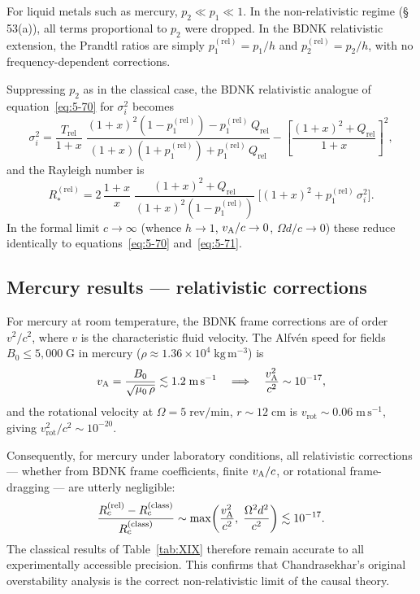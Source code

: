 For liquid metals such as mercury, $p_2\ll p_1\ll 1$.  In the non-relativistic
regime (\S\,53(a)), all terms proportional to $p_2$ were dropped.  In the
BDNK relativistic extension, the Prandtl ratios are simply
$p_{1}^{(\mathrm{rel})}=p_1/h$ and $p_{2}^{(\mathrm{rel})}=p_2/h$, with
no frequency-dependent corrections.

Suppressing $p_2$ as in the classical case, the BDNK relativistic analogue of
equation~\eqref{eq:5-70} for $\sigma_i^{2}$ becomes
\begin{equation}
  \sigma_i^{2} = \frac{T_{\mathrm{rel}}}{1{+}x}\;
  \frac{(1{+}x)^{2}(1{-}p_1^{(\mathrm{rel})}) - p_1^{(\mathrm{rel})}\,Q_{\mathrm{rel}}}
  {(1{+}x)(1{+}p_1^{(\mathrm{rel})})+p_1^{(\mathrm{rel})}\,Q_{\mathrm{rel}}}
  - \left[\frac{(1{+}x)^{2}{+}Q_{\mathrm{rel}}}{1{+}x}\right]^{2}\!,
  \label{eq:rel53-sigmai}
\end{equation}
and the Rayleigh number is
\begin{equation}
  R_*^{(\mathrm{rel})} = 2\,\frac{1+x}{x}\;\frac{(1{+}x)^{2}{+}Q_{\mathrm{rel}}}
  {(1{+}x)^{2}(1{-}p_1^{(\mathrm{rel})})}\;
  \bigl[(1{+}x)^{2}+p_1^{(\mathrm{rel})}\,\sigma_i^{2}\bigr].
  \label{eq:rel53-Rstar}
\end{equation}
In the formal limit $c\to\infty$ (whence $h\to 1$, $v_{\mathrm{A}}/c\to 0$,
$\Omega d/c\to 0$) these reduce identically to equations~\eqref{eq:5-70}
and~\eqref{eq:5-71}.

\subsection{Mercury results --- relativistic corrections}\label{subsec:rel53-mercury}

For mercury at room temperature, the BDNK frame corrections are of
order $v^{2}/c^{2}$, where $v$ is the characteristic fluid velocity.
The Alfv\'en speed for fields $B_0\leq 5{,}000\;\mathrm{G}$ in
mercury ($\rho\approx 1.36\times10^{4}\;\mathrm{kg\,m^{-3}}$) is
\begin{equation}
  v_{\mathrm{A}} = \frac{B_0}{\sqrt{\mu_0\,\rho}}
  \lesssim 1.2\;\mathrm{m\,s^{-1}}
  \quad\Longrightarrow\quad
  \frac{v_{\mathrm{A}}^{2}}{c^{2}} \sim 10^{-17},
  \label{eq:rel53-vA-Hg}
\end{equation}
and the rotational velocity at $\Omega = 5\;\mathrm{rev/min}$,
$r\sim 12\;\mathrm{cm}$ is $v_{\mathrm{rot}}\sim 0.06\;\mathrm{m\,s^{-1}}$,
giving $v_{\mathrm{rot}}^{2}/c^{2}\sim 10^{-20}$.

Consequently, for mercury under laboratory conditions, all relativistic
corrections --- whether from BDNK frame coefficients, finite
$v_{\mathrm{A}}/c$, or rotational frame-dragging --- are utterly negligible:
\begin{equation}
  \frac{R_c^{(\mathrm{rel})} - R_c^{(\mathrm{class})}}{R_c^{(\mathrm{class})}}
  \sim \max\!\left(
  \frac{v_{\mathrm{A}}^{2}}{c^{2}},\;
  \frac{\Omega^{2}d^{2}}{c^{2}}\right)
  \lesssim 10^{-17}.
  \label{eq:rel53-Hg-correction}
\end{equation}
The classical results of Table~\ref{tab:XIX} therefore remain accurate
to all experimentally accessible precision.  This confirms that
Chandrasekhar's original overstability analysis is the correct
non-relativistic limit of the causal theory.

